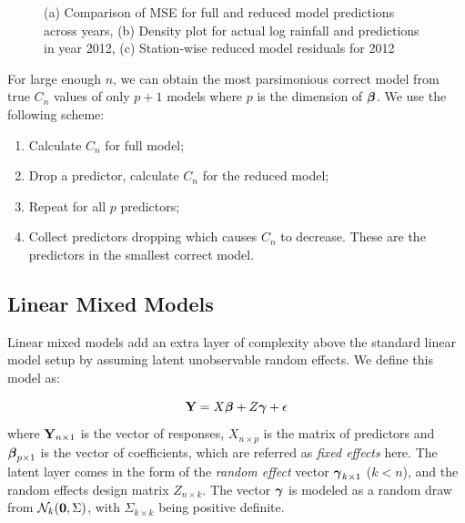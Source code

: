 \documentclass[11pt,twocolumn,twoside]{IEEEtran}
\begin{document}
\begin{figure}
\captionsetup{justification=centering, font=footnotesize}
\begin{center}
\caption{(a) Comparison of MSE for full and reduced model predictions across years, (b) Density plot for actual log rainfall and predictions in year 2012, (c) Station-wise reduced model residuals for 2012}
\label{fig:prepost}
\end{center}
\end{figure}

For large enough $n$, we can obtain the most parsimonious correct model from true $C_n$ values of only $p+1$ models where $p$ is the dimension of ${\boldsymbol{\beta}}$.  We use the following scheme:
\begin{enumerate}
\item Calculate $C_n$ for full model;
\item Drop a predictor, calculate $C_n$ for the reduced model;
\item Repeat for all $p$ predictors;
\item Collect predictors dropping which causes $C_n$ to decrease. These are the predictors in the smallest correct model.
\end{enumerate}

\subsection{Linear Mixed Models}
Linear mixed models add an extra layer of complexity above the standard linear model setup by assuming latent unobservable random effects. We define this model as:

\begin{equation}\label{eqn:mixedmodel}
{\mathbf{Y}} = X {\boldsymbol{\beta}} + Z {\boldsymbol{\gamma}} + \epsilon
\end{equation}
where ${\mathbf{Y}}_{n\times 1}$ is the vector of responses, $X_{n \times p}$ is the matrix of predictors and ${\boldsymbol{\beta}}_{p\times 1}$ is the vector of coefficients, which are referred as \textit{fixed effects} here. The latent layer comes in the form of the \textit{random effect} vector ${\boldsymbol{\gamma}}_{k\times 1}$ ($k < n$), and the random effects design matrix $Z_{n \times k}$. The vector ${\boldsymbol{\gamma}}$ is modeled as a random draw from $\mathcal{N}_k ({\bf 0}, \Sigma)$, with $\Sigma_{k \times k}$ being positive definite.
\end{document}
